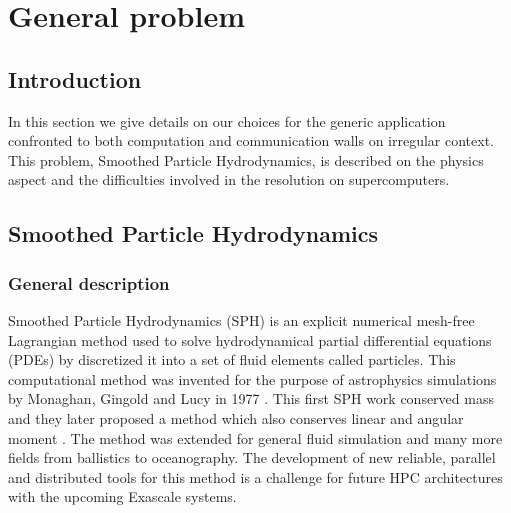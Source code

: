 \chapter{General problem}

\section{Introduction}
In this section we give details on our choices for the generic application confronted to both computation and communication walls on irregular context. 
This problem, Smoothed Particle Hydrodynamics, is described on the physics aspect and the difficulties involved in the resolution on supercomputers.  


\section{Smoothed Particle Hydrodynamics}

\subsection{General description}
Smoothed Particle Hydrodynamics (SPH) is an explicit numerical mesh-free Lagrangian method used to solve hydrodynamical partial differential equations (PDEs) by discretized it into a set of fluid elements called particles. 
This computational method was invented for the purpose of astrophysics simulations by Monaghan, Gingold and Lucy in 1977 \cite{lucy1977numerical,gingold1977smoothed}. 
This first SPH work conserved mass and they later proposed a method which also conserves linear and angular moment \cite{gingold1982kernel}. 
The method was extended for general fluid simulation and many more fields from ballistics to oceanography. 
The development of new reliable, parallel and distributed tools for this method is a challenge for future HPC architectures with the upcoming Exascale systems.

